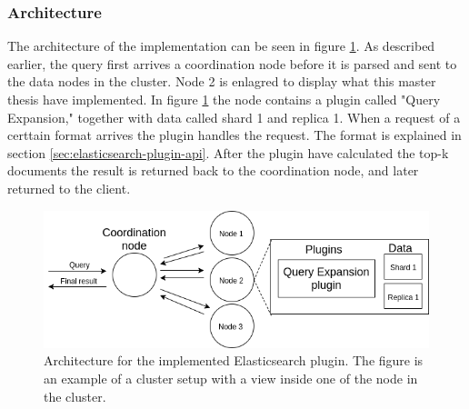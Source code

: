 \subsubsection{Architecture}
The architecture of the implementation can be seen in figure \ref{fig:elasticsearch-architecture}.
As described earlier,
the query first arrives a coordination node before it is parsed and sent to the data nodes in the cluster.
Node 2 is enlagred to display what this master thesis have implemented.
In figure \ref{fig:elasticsearch-architecture} the node contains a plugin called "Query Expansion,"
together with data called shard 1 and replica 1.
When a request of a certtain format arrives the plugin handles the request.
The format is explained in section \ref{sec:elasticsearch-plugin-api}.
After the plugin have calculated the top-k documents the result is returned back to the coordination node,
and later returned to the client.

\begin{figure}[h!]
  \centering \includegraphics[width=1\linewidth]{img/elasticsearch-architecture.png}
  \caption{Architecture for the implemented Elasticsearch plugin. The figure is an example of a cluster setup with a view inside one of the node in the cluster.}
  \label{fig:elasticsearch-architecture}
\end{figure}
